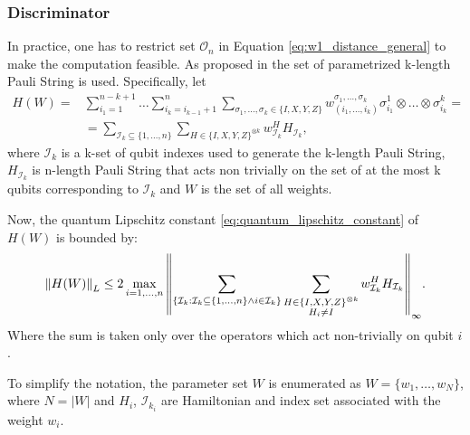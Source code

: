 \subsubsection{Discriminator}
In practice, one has to restrict set $\mathcal{O}_n$ in Equation
\ref{eq:w1_distance_general} to make the computation feasible.
As proposed in \cite{kiani2021quantum} the set of parametrized k-length Pauli
String is used. Specifically, let
\begin{equation}
\begin{split}
  \label{eq:parametrized_hamiltonian}
  H(W) = & \sum_{i_1 = 1}^{n-k+1} \ldots \sum_{i_k = i_{k-1} + 1}^{n}\sum_{\sigma_1, \ldots, \sigma_k \in \{I, X, Y, Z\}} w^{\sigma_1,
    \ldots, \sigma_k}_{(i_1, \ldots, i_k)} \sigma^1_{i_1} \otimes \ldots \otimes \sigma^k_{i_k}  = \\
  & = \sum_{\mathcal{I}_k \subseteq \{1, \ldots, n \}} \sum_{H \in \{ I,X,Y,Z \}^{\otimes k}} w_{\mathcal{I}_k}^HH_{\mathcal{I}_k},
\end{split}
\end{equation}
where $\mathcal{I}_k$ is a k-set of qubit indexes used to generate the k-length
Pauli String, $H_{\mathcal{I}_k}$ is n-length Pauli String that acts non
trivially on the set of at the most k qubits
corresponding to $\mathcal{I}_k$ and $W$ is the set of all weights.

Now, the quantum Lipschitz constant \eqref{eq:quantum_lipschitz_constant} of $H(W)$ is bounded by:
\begin{equation}
  \label{eq:quantum_lipschitz_bound}
  \left\lVert H(W)\right\rVert_L \leq 2 \max_{i = 1,\ldots,n}{\left\lVert\sum_{\{ \mathcal{I}_k: \mathcal{I}_k \subseteq \{1, \ldots, n \} \land i \in \mathcal{I}_k \}}
      \sum_{\substack{H \in \{ I,X,Y,Z \}^{\otimes k} \\
        H_{i} \neq I
      }} w_{\mathcal{I}_k}^HH_{\mathcal{I}_k} \right\rVert_{\infty}}.
\end{equation}
Where the sum is taken only over the operators which act non-trivially on qubit
$i$ \cite{kiani2021quantum}. 

To simplify the notation, the parameter set $W$ is enumerated as $W=\{w_1,
  \ldots, w_N\}$, where $N=|W|$ and $H_i$, $\mathcal{I}_{k_i}$ are Hamiltonian and index set
associated with the weight $w_i$.

